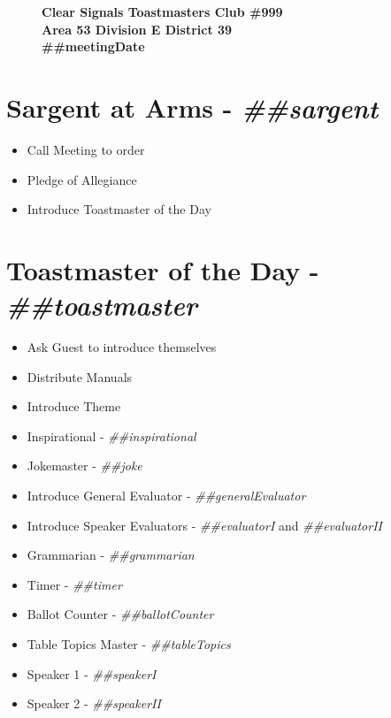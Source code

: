 \documentclass{article}
\newcommand{\meetingDate}{##meetingDate}
\newcommand{\toastmaster}{##toastmaster}
\newcommand{\sargent}{##sargent}
\newcommand{\tableTopics}{##tableTopics}
\newcommand{\generalEvaluator}{##generalEvaluator}
\newcommand{\evaluatorI}{##evaluatorI}
\newcommand{\evaluatorII}{##evaluatorII}
\newcommand{\speakerI}{##speakerI}
\newcommand{\speakerII}{##speakerII}
\newcommand{\grammarian}{##grammarian}
\newcommand{\timer}{##timer}
\newcommand{\inspirational}{##inspirational}
\newcommand{\ballotCounter}{##ballotCounter}
\newcommand{\joke}{##joke}
\begin{document}
\begin{figure}
  \centering
  \linespread{1}
  \large\textbf{Clear Signals Toastmasters Club \#999\\Area 53 Division E District 39\\ \meetingDate{}} \\
\end{figure}

\section*{Sargent at Arms - \textit{\sargent{}}}
\begin{itemize}
  \item Call Meeting to order
  \item Pledge of Allegiance
  \item Introduce Toastmaster of the Day
\end{itemize}

\section*{Toastmaster of the Day - \textit{\toastmaster{}}} 
\begin{itemize}
  \item Ask Guest to introduce themselves
  \item Distribute Manuals
  \item Introduce Theme
  \item Inspirational - \textit{\inspirational{}}
  \item Jokemaster - \textit{\joke{}}
  \item Introduce General Evaluator - \textit{\generalEvaluator{}}
  \item Introduce Speaker Evaluators - \textit{\evaluatorI{}} and \textit{\evaluatorII{}}
  \item Grammarian - \textit{\grammarian{}}
  \item Timer - \textit{\timer{}}
  \item Ballot Counter - \textit{\ballotCounter{}}
  \item Table Topics Master - \textit{\tableTopics{}}
  \item Speaker 1 - \textit{\speakerI{}}
  \item Speaker 2 - \textit{\speakerII{}}
\end{itemize}
\end{document}
